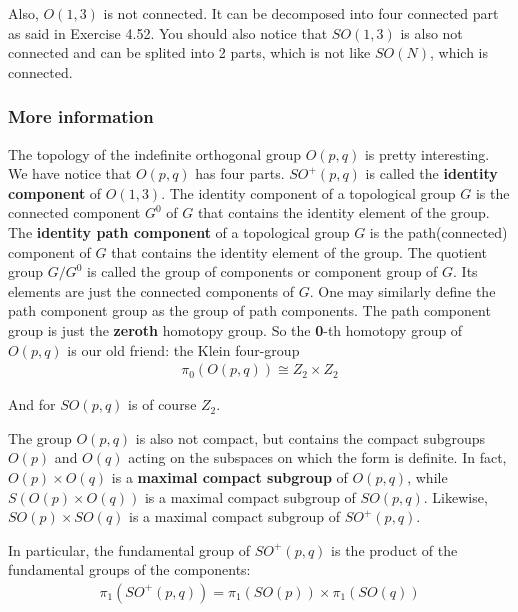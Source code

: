 \documentclass[]{ctexart}
\begin{document}
		Also, $O(1,3)$ is not connected. It can be decomposed into four connected part as said in Exercise 4.52. You should also notice that  $SO(1,3)$ is also not connected and can be splited into 2 parts, which is not like $SO(N)$, which is connected. 
			
			\subsubsection{More information}
				The topology of the indefinite orthogonal group $O(p,q)$ is pretty interesting. We have notice that $O(p,q)$ has four parts. $SO^+(p,q)$ is called the \textbf{identity component} of $O(1,3)$. The identity component of a topological group $ G $ is the connected component $ G^0 $ of $ G $ that contains the identity element of the group. The \textbf{identity path component }of a topological group $ G $ is the path(connected) component of $ G $ that contains the identity element of the group. The quotient group $ G/G^0 $ is called the group of components or component group of $ G $. Its elements are just the connected components of $ G $. One may similarly define the path component group as the group of path components. The path component group is just the \textbf{zeroth} homotopy group. So the \textbf{0}-th homotopy group of $O(p,q)$ is our old friend: the Klein four-group
					\begin{equation*}
					\begin{aligned}
						\pi _0(O(p,q))\cong Z_2\times Z_2
					\end{aligned}
					\end{equation*}
				
				And for $SO(p,q)$ is of course $Z_2$. 
				
				The group $ O(p, q) $ is also not compact, but contains the compact subgroups $ O(p) $ and $ O(q) $ acting on the subspaces on which the form is definite. In fact, $ O(p) \times O(q) $ is a \textbf{maximal compact subgroup} of $ O(p, q) $, while $ S(O(p) \times  O(q)) $ is a maximal compact subgroup of $ SO(p, q) $. Likewise, $ SO(p) \times SO(q) $ is a maximal compact subgroup of $ SO^+(p, q) $. 
				
				In particular, the fundamental group of $ SO^+(p, q) $ is the product of the fundamental groups of the components:
					\begin{equation*}
					\begin{aligned}
						\pi_1(SO^+(p, q))=\pi_1(SO(p)) \times  \pi_1(SO(q))
					\end{aligned}
					\end{equation*}
					
\end{document}
